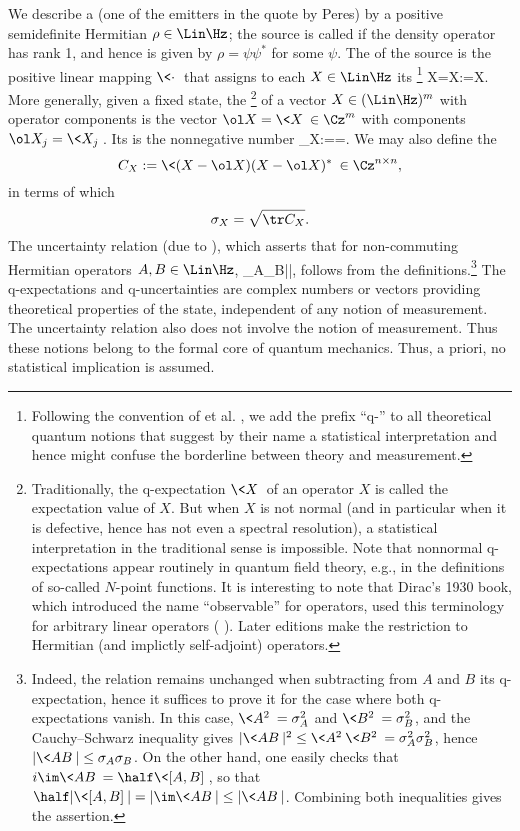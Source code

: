\documentclass[12pt]{article}
\begin{document}
We describe a  (one of the emitters in the quote by Peres)
by a positive semidefinite Hermitian
 $\rho\in \Lin \Hz$; the source is called
 if the density operator has rank 1, and hence is given by
$\rho=\psi\psi^*$ for some  $\psi$. The  of
the source is the positive linear mapping $\<\cdot\>$ that assigns to
each $X\in \Lin \Hz$ its \footnote{
Following the convention of  et al. \cite{AllBN2},
we add the prefix ``q-'' to all theoretical quantum notions that
suggest by their name a statistical interpretation and hence might
confuse the borderline between theory and measurement.
} %
\ol X=\<X\>:=\Tr\rho X.
\eeq
More generally, given a fixed state, the \footnote{
Traditionally, the q-expectation $\<X\>$ of an operator $X$ is called
the expectation value of $X$. But when $X$ is not normal (and in
particular when it is defective, hence has not even a spectral
resolution), a statistical interpretation in the traditional sense is
impossible. Note that nonnormal q-expectations appear routinely in
quantum field theory, e.g., in the definitions of so-called $N$-point
functions.
It is interesting to note that Dirac's 1930 book, which introduced the
name ``observable'' for operators, used this terminology for arbitrary
linear operators ( \cite[p.28]{Dir1}). Later editions make
the restriction to Hermitian (and implictly self-adjoint) operators.
} %
of a vector $X\in(\Lin \Hz)^m$ with operator components is the vector
$\ol X=\<X\>\in\Cz^m$ with components $\ol X_j=\<X_j\>$. Its
 is the nonnegative number
\sigma_X:==.
\eeq
We may also define the 
\[
C_X:=\<(X-\ol X)(X-\ol X)^*\>\in\Cz^{n\times n},
\]
in terms of which
\[
\sigma_X=\sqrt{\tr C_X}.
\]
The uncertainty relation (due to  \cite{Rob29}), which
asserts that for non-commuting Hermitian operators $A,B\in\Lin\Hz$,
\sigma_A\sigma_B\ge \half |\<[A,B]\>|,
\eeq
follows from the definitions.\footnote{
Indeed, the relation remains unchanged when subtracting from $A$ and
$B$ its q-expectation, hence it suffices to prove it for the case
where both q-expectations vanish. In this case, $\<A^2\>=\sigma_A^2$ and
$\<B^2\>=\sigma_B^2$, and the Cauchy--Schwarz inequality gives
$|\<AB\>|^2\le \<A^2\>\<B^2\>=\sigma_A^2\sigma_B^2$, hence
$|\<AB\>|\le\sigma_A\sigma_B$. On the other hand, one easily checks that
$i\im\<AB\>=\half\<[A,B]\>$, so that
$\half |\<[A,B]\>|=|\im\<AB\>|\le |\<AB\>|$. Combining both inequalities
gives the assertion.
} %
The q-expectations and q-uncertainties are complex numbers or vectors
providing theoretical properties of the state, independent of any notion
of measurement. The uncertainty relation also does not involve the
notion of measurement. Thus these notions belong to the formal core of
quantum mechanics. Thus, a priori, no statistical implication is
assumed.
\end{document}

